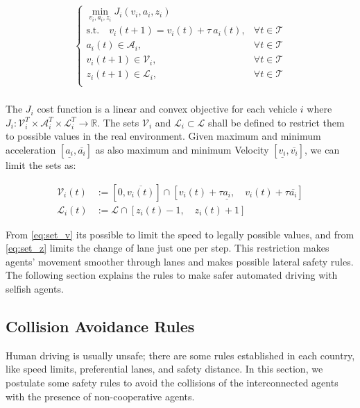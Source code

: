 \begin{gather}
    \left\{ \begin{array}{cl}
 \min_{v_i, a_i, z_i} J_i(v_i, a_i, z_i) & \\
\text{s.t.} \quad v_i(t+1)=v_i(t)+ \tau \ a_i(t), & \forall t \in \mathcal{T} \\
a_i(t) \in \mathcal{A}_i,  & \forall t \in \mathcal{T} \\
v_i(t+1) \in \mathcal{V}_i,  & \forall t \in \mathcal{T} \\
z_i(t+1) \in \mathcal{L}_i,  & \forall t \in \mathcal{T} \\
\end{array} \right.
\label{eq:MPC1}
\end{gather}
\\
The $J_i$ cost function is a linear and convex objective for each vehicle $i$ where $J_i:\mathcal{V}^T_i \times \mathcal{A}^T_i \times  \mathcal{L}^T_i \longrightarrow  \mathbb{R}$. The sets $\mathcal{V}_i$ and $\mathcal{L}_i \subset \mathcal{L}$ shall be defined to restrict them to possible values in the real environment. Given maximum and minimum acceleration $\left[ \underline{a_i}, \overline{a_i} \right]$ as also maximum and minimum Velocity $\left[ \underline{v_i}, \overline{v_i} \right]$, we can limit the sets as:

\begin{align}
    \mathcal{V}_i(t) & :=\left[ 0,\overline{v_i(t)} \right] \cap \left[ v_i(t)+ \tau  \underline{a_i},\quad v_i(t)+ \tau  \overline{a_i} \right]
    \label{eq:set_v}
\\
    \mathcal{L}_i(t) & :=\mathcal{L} \cap \left[ z_i(t) -1, \quad z_i(t)+1 \right]
    \label{eq:set_z}
\end{align}

From \ref{eq:set_v} its possible to limit the speed to legally possible values, and from \ref{eq:set_z} limits the change of lane just one per step. This restriction makes agents' movement smoother through lanes and makes possible lateral safety rules. The following section explains the rules to make safer automated driving with selfish agents.

\subsection{Collision Avoidance Rules}
 
Human driving is usually unsafe; there are some rules established in each country, like speed limits, preferential lanes, and safety distance. In this section, we postulate some safety rules to avoid the collisions of the interconnected agents with the presence of non-cooperative agents.\\

